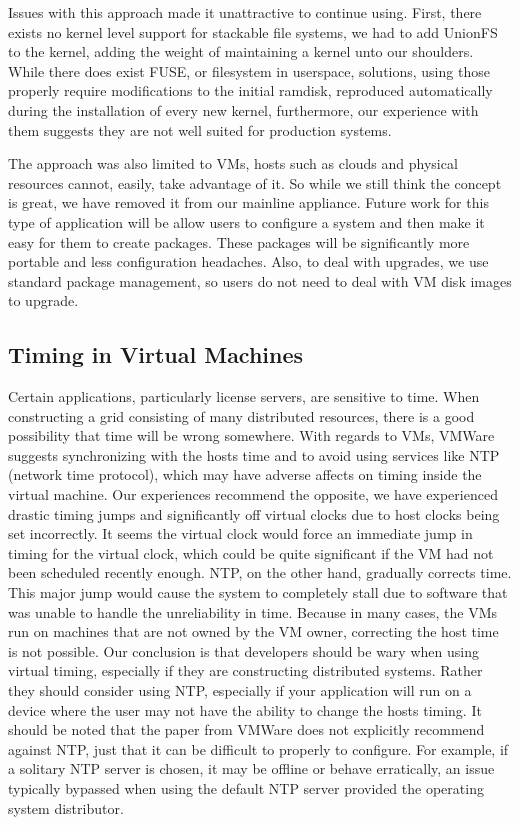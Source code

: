 \documentclass[conference]{IEEEtran}
\begin{document}
Issues with this approach made it unattractive to continue using.  First, there
exists no kernel level support for stackable file systems, we had to add
UnionFS~\cite{unionfs} to the kernel, adding the weight of maintaining a kernel
unto our shoulders.  While there does exist FUSE, or filesystem in userspace,
solutions, using those properly require modifications to the initial ramdisk,
reproduced automatically during the installation of every new kernel,
furthermore, our experience with them suggests they are not well suited for
production systems.

The approach was also limited to VMs, hosts such as clouds and physical
resources cannot, easily, take advantage of it.  So while we still think the
concept is great, we have removed it from our mainline appliance.  Future work
for this type of application will be allow users to configure a system and then
make it easy for them to create packages.  These packages will be significantly
more portable and less configuration headaches.  Also, to deal with upgrades,
we use standard package management, so users do not need to deal with VM disk
images to upgrade.

\subsection{Timing in Virtual Machines}

Certain applications, particularly license servers, are sensitive to time.
When constructing a grid consisting of many distributed resources, there is a
good possibility that time will be wrong somewhere.  With regards to VMs,
VMWare~\cite{vmware_timing} suggests synchronizing with the hosts time and to
avoid using services like NTP (network time protocol), which may have adverse
affects on timing inside the virtual machine.  Our experiences recommend the
opposite, we have experienced drastic timing jumps and significantly off
virtual clocks due to host clocks being set incorrectly.  It seems the virtual
clock would force an immediate jump in timing for the virtual clock, which
could be quite significant if the VM had not been scheduled recently enough.
NTP, on the other hand, gradually corrects time.  This major jump would cause
the system to completely stall due to software that was unable to handle the
unreliability in time.  Because in many cases, the VMs run on machines that are
not owned by the VM owner, correcting the host time is not possible.  Our
conclusion is that developers should be wary when using virtual timing,
especially if they are constructing distributed systems.  Rather they should
consider using NTP, especially if your application will run on a device where
the user may not have the ability to change the hosts timing.  It should be
noted that the paper from VMWare does not explicitly recommend against NTP,
just that it can be difficult to properly to configure.  For example, if a
solitary NTP server is chosen, it may be offline or behave erratically, an
issue typically bypassed when using the default NTP server provided the
operating system distributor.
\end{document}

